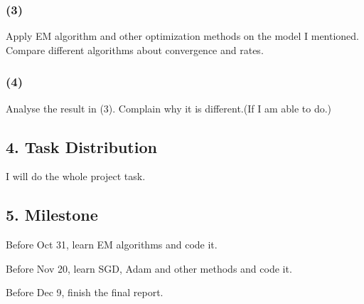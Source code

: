 \documentclass{article}
\begin{document}
 \subsubsection*{(3)}
 Apply EM algorithm and other optimization methods on the model I mentioned. Compare different algorithms about convergence and rates.
  \subsubsection*{(4)}
  Analyse the result in (3). Complain why it is different.(If I am able to do.)
\subsection*{4. Task Distribution}
I will do the whole project task.
\subsection*{5. Milestone}

Before Oct 31, learn EM algorithms and code it.

Before Nov 20, learn SGD, Adam and other methods and code it.

Before Dec 9, finish the final report.
\end{document}
